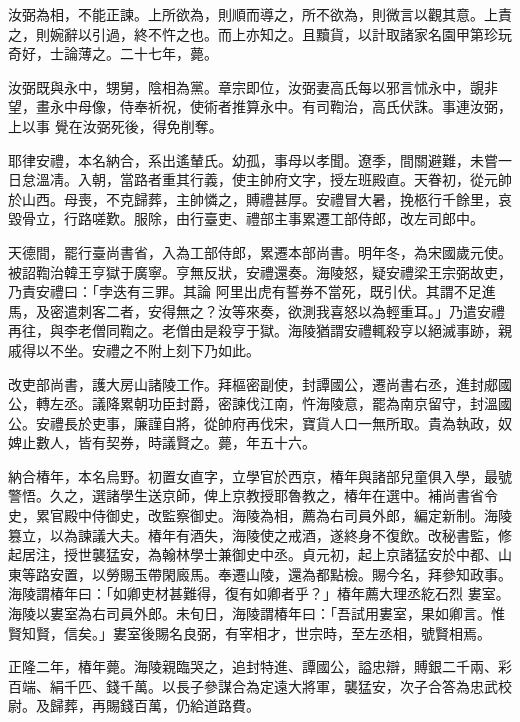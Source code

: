\begin{pinyinscope}
 汝弼為相，不能正諫。上所欲為，則順而導之，所不欲為，則微言以觀其意。上責之，則婉辭以引過，終不忤之也。而上亦知之。且黷貨，以計取諸家名園甲第珍玩奇好，士論薄之。二十七年，薨。



 汝弼既與永中，甥舅，陰相為黨。章宗即位，汝弼妻高氏每以邪言怵永中，覬非望，畫永中母像，侍奉祈祝，使術者推算永中。有司鞫治，高氏伏誅。事連汝弼，上以事
 覺在汝弼死後，得免削奪。



 耶律安禮，本名納合，系出遙輦氏。幼孤，事母以孝聞。遼季，間關避難，未嘗一日怠溫凊。入朝，當路者重其行義，使主帥府文字，授左班殿直。天眷初，從元帥於山西。母喪，不克歸葬，主帥憐之，賻禮甚厚。安禮冒大暑，挽柩行千餘里，哀毀骨立，行路嗟歎。服除，由行臺吏、禮部主事累遷工部侍郎，改左司郎中。



 天德間，罷行臺尚書省，入為工部侍郎，累遷本部尚書。明年冬，為宋國歲元使。被詔鞫治韓王亨獄于廣寧。亨無反狀，安禮還奏。海陵怒，疑安禮梁王宗弼故吏，乃責安禮曰：「孛迭有三罪。其論
 阿里出虎有誓券不當死，既引伏。其謂不足進馬，及密遣刺客二者，安得無之？汝等來奏，欲測我喜怒以為輕重耳。」乃遣安禮再往，與李老僧同鞫之。老僧由是殺亨于獄。海陵猶謂安禮輒殺亨以絕滅事跡，親戚得以不坐。安禮之不附上刻下乃如此。



 改吏部尚書，護大房山諸陵工作。拜樞密副使，封譚國公，遷尚書右丞，進封郕國公，轉左丞。議降累朝功臣封爵，密諫伐江南，忤海陵意，罷為南京留守，封溫國公。安禮長於吏事，廉謹自將，從帥府再伐宋，寶貨人口一無所取。貴為執政，奴婢止數人，皆有契券，時議賢之。薨，年五十六。



 納合椿年，本名烏野。初置女直字，立學官於西京，椿年與諸部兒童俱入學，最號警悟。久之，選諸學生送京師，俾上京教授耶魯教之，椿年在選中。補尚書省令史，累官殿中侍御史，改監察御史。海陵為相，薦為右司員外郎，編定新制。海陵篡立，以為諫議大夫。椿年有酒失，海陵使之戒酒，遂終身不復飲。改秘書監，修起居注，授世襲猛安，為翰林學士兼御史中丞。貞元初，起上京諸猛安於中都、山東等路安置，以勞賜玉帶閑廄馬。奉遷山陵，還為都點檢。賜今名，拜參知政事。海陵謂椿年曰：「如卿吏材甚難得，復有如卿者乎？」椿年薦大理丞紇石烈
 婁室。海陵以婁室為右司員外郎。未旬日，海陵謂椿年曰：「吾試用婁室，果如卿言。惟賢知賢，信矣。」婁室後賜名良弼，有宰相才，世宗時，至左丞相，號賢相焉。



 正隆二年，椿年薨。海陵親臨哭之，追封特進、譚國公，謚忠辯，賻銀二千兩、彩百端、絹千匹、錢千萬。以長子參謀合為定遠大將軍，襲猛安，次子合答為忠武校尉。及歸葬，再賜錢百萬，仍給道路費。




\end{pinyinscope}

